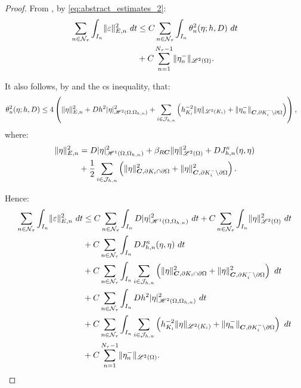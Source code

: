 \begin{proof}
    From , by \cref{eq:abstract_estimates_2}:
    \begin{align*}
        \sum_{n \in \mathcal{N}_{\tau}} \int_{I_n} \lVert \varepsilon \rVert_{E, n}^2 ~ dt &\leq C \sum_{n \in \mathcal{N}_{\tau}} \int_{I_n} \theta_n^2(\eta; h, D) ~ dt \\
        &+ C \sum_{n = 1}^{N_{\tau} - 1} \lVert \eta_n^- \rVert_{\mathscr{L}^{2}(\Omega)}.
    \end{align*}

    It also follows, by  and the \acrshort{cs} inequality, that:
    \begin{align*}
        \theta_n^2(\eta; h, D) &\leq 4 \left( \lVert \eta \rVert_{E, n}^2 + D h^2 \lvert \eta \rvert_{\mathscr{H}^{2}(\Omega, \Omega_{h, n})}^2 + \sum_{i \in \mathcal{J}_{h, n}} \left( h_{K_i}^{-2} \lVert \eta \rVert_{\mathscr{L}^{2}(K_i)} + \lVert \eta_n^- \rVert_{\bm{C}, \partial K_i^- \setminus \partial \Omega} \right) \right),
    \end{align*}
    where:
    \begin{align*}
        \lVert \eta \rVert_{E, n}^2 &= D \lvert \eta \rvert_{\mathscr{H}^{1}(\Omega, \Omega_{h, n})}^2 + \beta_{R \bm{C}} \lVert \eta \rVert_{\mathscr{L}^{2}(\Omega)}^2 + D J^{\kappa}_{h, n}(\eta, \eta) \\
        &+ \frac{1}{2} \sum_{i \in \mathcal{J}_{h, n}} \left( \lVert \eta \rVert_{\bm{C}, \partial K_i \cap \partial \Omega}^2 + \lVert \eta \rVert_{\bm{C}, \partial K_i^- \setminus \partial \Omega}^2 \right).
    \end{align*}

    Hence:
    \begin{align*}
        \sum_{n \in \mathcal{N}_{\tau}} \int_{I_n} \lVert \varepsilon \rVert_{E, n}^2 ~ dt &\leq C \sum_{n \in \mathcal{N}_{\tau}} \int_{I_n} D \lvert \eta \rvert_{\mathscr{H}^{1}(\Omega, \Omega_{h, n})}^2 ~ dt + C \sum_{n \in \mathcal{N}_{\tau}} \int_{I_n} \lVert \eta \rVert_{\mathscr{L}^{2}(\Omega)}^2 ~ dt \\
        &+ C \sum_{n \in \mathcal{N}_{\tau}} \int_{I_n} D J^{\kappa}_{h, n}(\eta, \eta) ~ dt \\
        &+ C \sum_{n \in \mathcal{N}_{\tau}} \int_{I_n} \sum_{i \in \mathcal{J}_{h, n}} \left( \lVert \eta \rVert_{\bm{C}, \partial K_i \cap \partial \Omega}^2 + \lVert \eta \rVert_{\bm{C}, \partial K_i^- \setminus \partial \Omega}^2 \right) ~ dt \\
        &+ C \sum_{n \in \mathcal{N}_{\tau}} \int_{I_n} D h^2 \lvert \eta \rvert_{\mathscr{H}^{2}(\Omega, \Omega_{h, n})}^2 ~ dt \\
        &+ C \sum_{n \in \mathcal{N}_{\tau}} \int_{I_n} \sum_{i \in \mathcal{J}_{h, n}} \left( h_{K_i}^{-2} \lVert \eta \rVert_{\mathscr{L}^{2}(K_i)} + \lVert \eta_n^- \rVert_{\bm{C}, \partial K_i^- \setminus \partial \Omega} \right) ~ dt \\
        &+ C \sum_{n = 1}^{N_{\tau} - 1} \lVert \eta_n^- \rVert_{\mathscr{L}^{2}(\Omega)}.
    \end{align*}


\end{proof}
